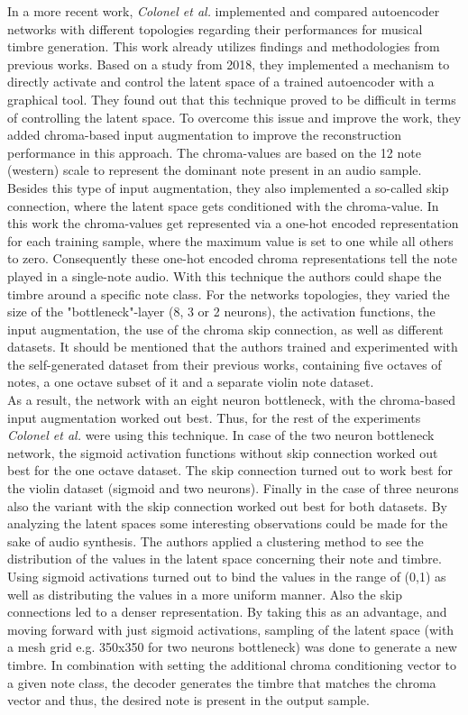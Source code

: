 In a more recent work, \textit{Colonel et al.} implemented and compared autoencoder networks with different topologies regarding their performances for musical timbre generation. \cite{Colonel2020} This work already utilizes findings and methodologies from previous works. Based on a study from 2018, they implemented a mechanism to directly activate and control the latent space of a trained autoencoder with a graphical tool. They found out that this technique proved to be difficult in terms of controlling the latent space. To overcome this issue and improve the work, they added chroma-based input augmentation to improve the reconstruction performance in this approach. The chroma-values are based on the 12 note (western) scale to represent the dominant note present in an audio sample. Besides this type of input augmentation, they also implemented a so-called skip connection, where the latent space gets conditioned with the chroma-value. In this work the chroma-values get represented via a one-hot encoded representation for each training sample, where the maximum value is set to one while all others to zero. Consequently these one-hot encoded chroma representations tell the note played in a single-note audio. With this technique the authors could shape the timbre around a specific note class. For the networks topologies, they varied the size of the "bottleneck"-layer (8, 3 or 2 neurons), the activation functions, the input augmentation, the use of the chroma skip connection, as well as different datasets. It should be mentioned that the authors trained and experimented with the self-generated dataset from their previous works, containing five octaves of notes, a one octave subset of it and a separate violin note dataset.\\
As a result, the network with an eight neuron bottleneck, with the chroma-based input augmentation worked out best. Thus, for the rest of the experiments \textit{Colonel et al.} were using this technique. In case of the two neuron bottleneck network, the sigmoid activation functions without skip connection worked out best for the one octave dataset. The skip connection turned out to work best for the violin dataset (sigmoid and two neurons). Finally in the case of three neurons also the variant with the skip connection worked out best for both datasets. By analyzing the latent spaces some interesting observations could be made for the sake of audio synthesis. The authors applied a clustering method to see the distribution of the values in the latent space concerning their note and timbre. Using sigmoid activations turned out to bind the values in the range of (0,1) as well as distributing the values in a more uniform manner. Also the skip connections led to a denser representation. By taking this as an advantage, and moving forward with just sigmoid activations, sampling of the latent space (with a mesh grid e.g. 350x350 for two neurons bottleneck) was done to generate a new timbre. In combination with setting the additional chroma conditioning vector to a given note class, the decoder generates the timbre that matches the chroma vector and thus, the desired note is present in the output sample.\\

